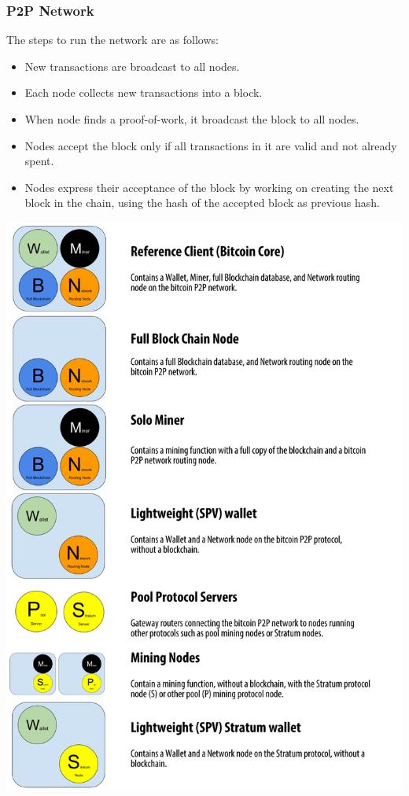 \begin{frame}
    \frametitle{P2P Network}
    The steps to run the network are as follows:
    \begin{itemize}
        \item New transactions are broadcast to all nodes.
        \item Each node collects new transactions into a block.
        \item When node finds a proof-of-work, it broadcast the block to all nodes.
        \item Nodes accept the block only if all transactions in it are valid and not already spent.
        \item Nodes express their acceptance of the block by working on creating the next block in the chain, using the hash of the accepted block as previous hash.
    \end{itemize}
\end{frame}

\begin{frame}
    \includegraphics[scale=0.6]{./figures/mbc2_0802.png}
\end{frame}

